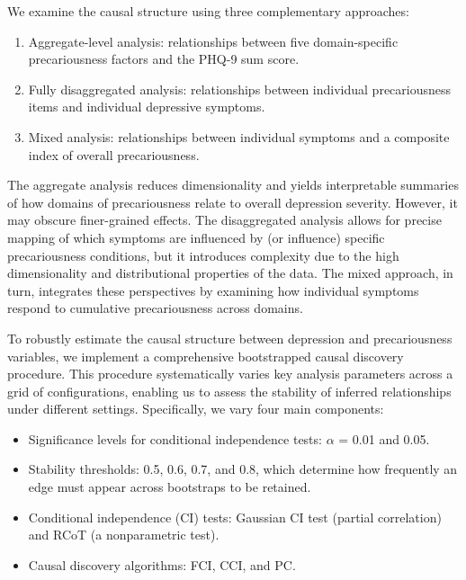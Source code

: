 \documentclass[
]{article}
\providecommand{\tightlist}{%
  \setlength{\itemsep}{0pt}\setlength{\parskip}{0pt}}\usepackage{longtable,booktabs,array}
\begin{document}
We examine the causal structure using three complementary approaches:

\begin{enumerate}
\def\labelenumi{\arabic{enumi}.}
\tightlist
\item
  Aggregate-level analysis: relationships between five domain-specific
  precariousness factors and the PHQ-9 sum score.
\item
  Fully disaggregated analysis: relationships between individual
  precariousness items and individual depressive symptoms.
\item
  Mixed analysis: relationships between individual symptoms and a
  composite index of overall precariousness.
\end{enumerate}

The aggregate analysis reduces dimensionality and yields interpretable
summaries of how domains of precariousness relate to overall depression
severity. However, it may obscure finer-grained effects. The
disaggregated analysis allows for precise mapping of which symptoms are
influenced by (or influence) specific precariousness conditions, but it
introduces complexity due to the high dimensionality and distributional
properties of the data. The mixed approach, in turn, integrates these
perspectives by examining how individual symptoms respond to cumulative
precariousness across domains.

To robustly estimate the causal structure between depression and
precariousness variables, we implement a comprehensive bootstrapped
causal discovery procedure. This procedure systematically varies key
analysis parameters across a grid of configurations, enabling us to
assess the stability of inferred relationships under different settings.
Specifically, we vary four main components:

\begin{itemize}
\tightlist
\item
  Significance levels for conditional independence tests: \(\alpha\) =
  0.01 and 0.05.
\item
  Stability thresholds: 0.5, 0.6, 0.7, and 0.8, which determine how
  frequently an edge must appear across bootstraps to be retained.
\item
  Conditional independence (CI) tests: Gaussian CI test (partial
  correlation) and RCoT (a nonparametric test).
\item
  Causal discovery algorithms: FCI, CCI, and PC.
\end{itemize}
\end{document}
